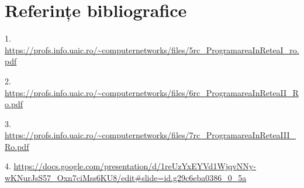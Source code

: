\documentclass{article}
\begin{document}
\section{Referințe bibliografice}
\hspace{0.5cm}1. \url{https://profs.info.uaic.ro/~computernetworks/files/5rc_ProgramareaInReteaI_ro.pdf }

2. \url{https://profs.info.uaic.ro/~computernetworks/files/6rc_ProgramareaInReteaII_Ro.pdf}

3. \url{https://profs.info.uaic.ro/~computernetworks/files/7rc_ProgramareaInReteaIII_Ro.pdf}

4. \url{https://docs.google.com/presentation/d/1reUzYxEYVd1WjqvNNy-wKNurJsS57_Oxn7ciMss6KU8/edit#slide=id.g29c6eba0386_0_5a}
\end{document}
